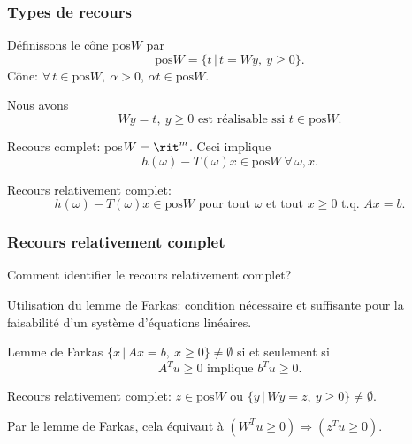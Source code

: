 \begin{frame}
	\frametitle{Types de recours}
	
	Définissons le cône pos$W$ par
	\[
	\mbox{pos}W = \lbrace t \,|\, t = Wy,\ y \geq 0 \rbrace.
	\]
	Cône: $\forall\, t \in \mbox{pos}W,\ \alpha > 0$, $\alpha t \in  \mbox{pos}W$.
	
	\mbox{}
	
	Nous avons
	\[
	Wy = t,\ y \geq 0 \mbox{ est réalisable ssi } t \in \mbox{pos}W.
	\]
	
	\mbox{}
	
	{\red Recours complet}: {\blue pos$W = \rit^m$}.
	Ceci implique
	\[
	h(\omega) - T(\omega)x \in \mbox{pos}W \ \forall\, \omega, x.
	\]
	
	\mbox{}
	
	{\red Recours relativement complet}:
	\[
	h(\omega) - T(\omega)x \in \mbox{pos}W \mbox{ pour tout } \omega \mbox{ et tout
	}x \geq 0 \mbox{ t.q. } Ax=b.
	\]
	
\end{frame}

\begin{frame}
	\frametitle{Recours relativement complet}
	
	Comment identifier le recours relativement complet?
	
	\mbox{}
	
	Utilisation du lemme de Farkas: condition nécessaire et suffisante
	pour la faisabilité d'un système d'équations linéaires.
	
	\begin{block}{Lemme de Farkas}
		$\lbrace x \,|\,  Ax = b,\ x \geq 0 \rbrace \ne \emptyset$
		si et seulement si
		\[
		A^Tu \geq 0 \mbox{ implique } b^Tu \geq 0.
		\]
	\end{block}
	
	\mbox{}
	
	Recours relativement complet: $z \in \mbox{pos} W$ ou $\lbrace y \,|\,
	Wy = z,\ y \geq 0\rbrace \ne \emptyset$.
	
	Par le lemme de Farkas, cela équivaut à
	$(W^Tu \geq 0) \Rightarrow (z^Tu \geq 0).$
	
\end{frame}

